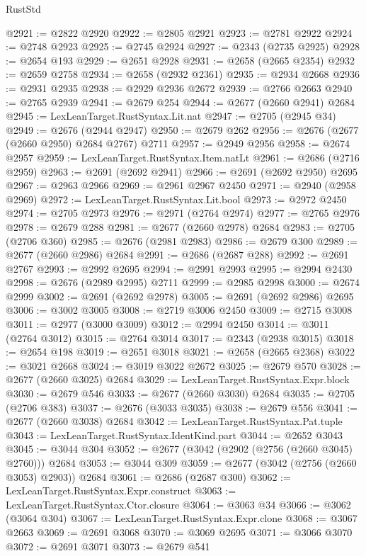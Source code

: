 \begin{lexlean}{RustStd}
\begin{coremodule}
@2921 := @2822 @2920
@2922 := @2805 @2921
@2923 := @2781 @2922
@2924 := @2748 @2923
@2925 := @2745 @2924
@2927 := @2343 (@2735 @2925)
@2928 := @2654 @193
@2929 := @2651 @2928
@2931 := @2658 (@2665 @2354)
@2932 := @2659 @2758
@2934 := @2658 (@2932 @2361)
@2935 := @2934 @2668
@2936 := @2931 @2935
@2938 := @2929 @2936 @2672
@2939 := @2766 @2663
@2940 := @2765 @2939
@2941 := @2679 @254
@2944 := @2677 (@2660 @2941) @2684
@2945 := LexLeanTarget.RustSyntax.Lit.nat
@2947 := @2705 (@2945 @34)
@2949 := @2676 (@2944 @2947)
@2950 := @2679 @262
@2956 := @2676 (@2677 (@2660 @2950) @2684 @2767) @2711
@2957 := @2949 @2956
@2958 := @2674 @2957
@2959 := LexLeanTarget.RustSyntax.Item.natLt
@2961 := @2686 (@2716 @2959)
@2963 := @2691 (@2692 @2941)
@2966 := @2691 (@2692 @2950) @2695
@2967 := @2963 @2966
@2969 := @2961 @2967 @2450
@2971 := @2940 (@2958 @2969)
@2972 := LexLeanTarget.RustSyntax.Lit.bool
@2973 := @2972 @2450
@2974 := @2705 @2973
@2976 := @2971 (@2764 @2974)
@2977 := @2765 @2976
@2978 := @2679 @288
@2981 := @2677 (@2660 @2978) @2684
@2983 := @2705 (@2706 @360)
@2985 := @2676 (@2981 @2983)
@2986 := @2679 @300
@2989 := @2677 (@2660 @2986) @2684
@2991 := @2686 (@2687 @288)
@2992 := @2691 @2767
@2993 := @2992 @2695
@2994 := @2991 @2993
@2995 := @2994 @2430
@2998 := @2676 (@2989 @2995) @2711
@2999 := @2985 @2998
@3000 := @2674 @2999
@3002 := @2691 (@2692 @2978)
@3005 := @2691 (@2692 @2986) @2695
@3006 := @3002 @3005
@3008 := @2719 @3006 @2450
@3009 := @2715 @3008
@3011 := @2977 (@3000 @3009)
@3012 := @2994 @2450
@3014 := @3011 (@2764 @3012)
@3015 := @2764 @3014
@3017 := @2343 (@2938 @3015)
@3018 := @2654 @198
@3019 := @2651 @3018
@3021 := @2658 (@2665 @2368)
@3022 := @3021 @2668
@3024 := @3019 @3022 @2672
@3025 := @2679 @570
@3028 := @2677 (@2660 @3025) @2684
@3029 := LexLeanTarget.RustSyntax.Expr.block
@3030 := @2679 @546
@3033 := @2677 (@2660 @3030) @2684
@3035 := @2705 (@2706 @383)
@3037 := @2676 (@3033 @3035)
@3038 := @2679 @556
@3041 := @2677 (@2660 @3038) @2684
@3042 := LexLeanTarget.RustSyntax.Pat.tuple
@3043 := LexLeanTarget.RustSyntax.IdentKind.part
@3044 := @2652 @3043
@3045 := @3044 @304
@3052 := @2677 (@3042 (@2902 (@2756 (@2660 @3045) @2760))) @2684
@3053 := @3044 @309
@3059 := @2677 (@3042 (@2756 (@2660 @3053) @2903)) @2684
@3061 := @2686 (@2687 @300)
@3062 := LexLeanTarget.RustSyntax.Expr.construct
@3063 := LexLeanTarget.RustSyntax.Ctor.closure
@3064 := @3063 @34
@3066 := @3062 (@3064 @304)
@3067 := LexLeanTarget.RustSyntax.Expr.clone
@3068 := @3067 @2663
@3069 := @2691 @3068
@3070 := @3069 @2695
@3071 := @3066 @3070
@3072 := @2691 @3071
@3073 := @2679 @541

\end{coremodule}
\end{lexlean}
